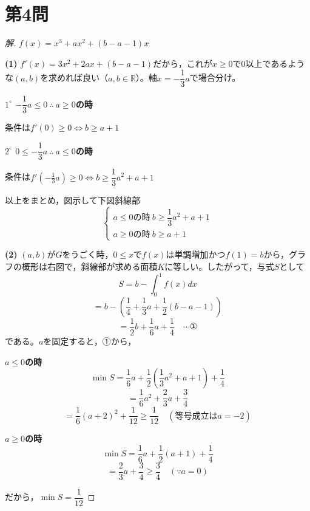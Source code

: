 \documentclass[../main.tex]{subfiles}
\begin{document}
\newpage

\section*{第4問}

\begin{proof}[解]
  $f(x)=x^3+ax^2+(b-a-1)x$

  \textbf{(1)} $f'(x)=3x^2+2ax+(b-a-1)$だから，これが$x\ge0$で0以上であるような$(a,b)$を求めれば良い（$a,b\in\mathbb{R}$）。軸$x=-\dfrac13a$で場合分け。

  \textbf{$1^\circ$ $-\dfrac13a\le0\ \therefore\ a\ge0$の時}

  条件は$f'(0)\ge0\iff b\ge a+1$

  \textbf{$2^\circ$ $0\le-\dfrac13a\ \therefore\ a\le0$の時}

  条件は$f'(-\tfrac13a)\ge0\iff b\ge\dfrac13a^2+a+1$

  以上をまとめ，図示して下図斜線部
  \[
    \begin{cases}
      a\le0\text{の時}\ b\ge\dfrac13a^2+a+1 \\
      a\ge0\text{の時}\ b\ge a+1
    \end{cases}
  \]

  \begin{center}
  \end{center}

  \textbf{(2)} $(a,b)$が$G$をうごく時，$0\le x$で$f(x)$は単調増加かつ$f(1)=b$から，グラフの概形は右図で，斜線部が求める面積$K$に等しい。したがって，与式$S$として
  \[
    S=b-\int_0^1f(x)dx
  \]
  \[
    =b-\left(\frac14+\frac13a+\frac12(b-a-1)\right)
  \]
  \[
    =\frac12b+\frac16a+\frac14 \quad\cdots\text{①}
  \]
  である。$a$を固定すると，①から，

  \textbf{$a\le0$の時}
  \[
    \min S=\frac16a+\frac12\left(\frac13a^2+a+1\right)+\frac14
  \]
  \[
    =\frac16a^2+\frac23a+\frac34
  \]
  \[
    =\frac16(a+2)^2+\frac1{12}\ge\frac1{12} \quad(\text{等号成立は}a=-2)
  \]

  \textbf{$a\ge0$の時}
  \[
    \min S=\frac16a+\frac12(a+1)+\frac14
  \]
  \[
    =\frac23a+\frac34\ge\frac34 \quad(\because a=0)
  \]

  だから，$\min S=\dfrac1{12}$
\end{proof}
\end{document}
